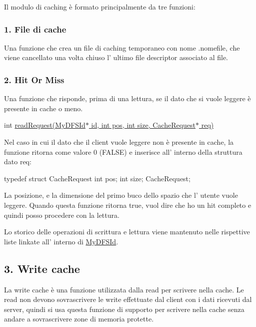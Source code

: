 Il modulo di caching è formato principalmente da tre funzioni\+:

\subsubsection*{1. File di cache}

Una funzione che crea un file di caching temporaneo con nome .nomefile, che viene cancellato una volta chiuso l' ultimo file descriptor associato al file.

\subsubsection*{2. Hit Or Miss}

Una funzione che risponde, prima di una lettura, se il dato che si vuole leggere è presente in cache o meno.

int \hyperlink{Cache_8h_a403785c0f2573dd16d81eff4ab26c20d}{read\+Request(\+My\+D\+F\+S\+Id$\ast$ id, int pos, int size, Cache\+Request$\ast$ req)}

Nel caso in cui il dato che il client vuole leggere non è presente in cache, la funzione ritorna come valore 0 (F\+A\+L\+S\+E) e inserisce all' interno della struttura dato req\+: \begin{DoxyVerb}typedef struct CacheRequest {
    int pos;
    int size;
}CacheRequest;
\end{DoxyVerb}
 La posizione, e la dimensione del primo buco dello spazio che l' utente vuole leggere. Quando questa funzione ritorna true, vuol dire che ho un hit completo e quindi posso procedere con la lettura.

Lo storico delle operazioni di scrittura e lettura viene mantenuto nelle rispettive liste linkate all' interno di \hyperlink{structMyDFSId}{My\+D\+F\+S\+Id}.

\subsection*{3. Write cache}

La write cache è una funzione utilizzata dalla read per scrivere nella cache. Le read non devono sovrascrivere le write effettuate dal client con i dati ricevuti dal server, quindi si usa questa funzione di supporto per scrivere nella cache senza andare a sovrascrivere zone di memoria protette. 